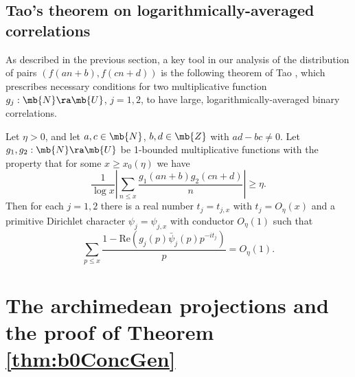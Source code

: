 \subsection{Tao's theorem on logarithmically-averaged correlations} 
As described in the previous section, a key tool in our analysis of the distribution of pairs $(f(an+b),f(cn+d))$ is the following theorem of Tao \cite{Tao}, which prescribes necessary conditions for two multiplicative function $g_j: \mb{N} \ra \mb{U}$, $j = 1,2$, to have large, logarithmically-averaged binary correlations.
%
\begin{thm} \label{thm1:Tao}
Let $\eta > 0$, and let $a,c \in \mb{N}$, $b,d \in \mb{Z}$ with $ad-bc \neq 0$. Let $g_1,g_2: \mb{N} \ra \mb{U}$ be 1-bounded multiplicative functions with the property that for some $x \geq x_0(\eta)$ we have
$$
\frac{1}{\log x}\left|\sum_{n \leq x} \frac{g_1(an+b)g_2(cn+d)}{n}\right| \geq \eta.
$$
Then for each $j = 1,2$ there is a real number $t_j = t_{j,x}$ with $t_j = O_{\eta}(x)$ and a primitive Dirichlet character $\psi_j = \psi_{j,x}$ with conductor $O_{\eta}(1)$ such that
$$
\sum_{p \leq x} \frac{1-\mathrm{Re}(g_j(p)\bar{\psi}_j(p)p^{-it_j})}{p} = O_{\eta}(1).
%
$$
\end{thm}


\section{The archimedean projections and the proof of Theorem \ref{thm:b0ConcGen}}
%
%
%
%
%
%
%
%
%
%
%
%
%

